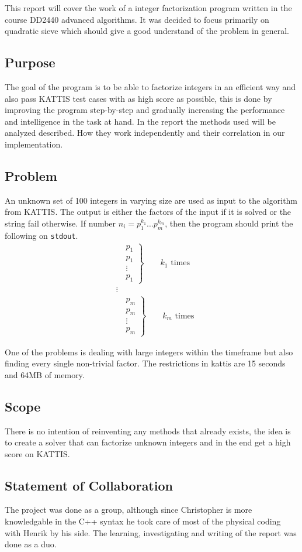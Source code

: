 This report will cover the work of a integer factorization program written in the course DD2440 advanced algorithms. It was decided to focus primarily on quadratic sieve which should give a good understand of the problem in general.

\subsection{Purpose}
The goal of the program is to be able to factorize integers in an efficient way and also pass KATTIS test cases with as high score as possible, this is done by improving the program step-by-step and gradually increasing the performance and intelligence in the task at hand. In the report the methods used will be analyzed described. How they work independently and their correlation in our implementation.

\subsection{Problem}
An unknown set of 100 integers in varying size are used as input to the algorithm from KATTIS. The output is either the factors of the input if it is solved or the string fail otherwise. If number $n_i = p_1^{k_1} \ldots p_m^{k_m}$, then the program should print the following on \texttt{stdout}.
\begin{align*}
&\left.\begin{aligned}
      &p_1 \\
      &p_1 \\
      &\vdots \\
      &p_1 
      \end{aligned}
\right\}
\qquad k_1 \text{ times} \\
&\vdots \\
&\left.\begin{aligned}
      &p_m \\
      &p_m \\
      &\vdots \\
      &p_m 
      \end{aligned}
\right\}
\qquad k_m \text{ times}
\end{align*}

One of the problems is dealing with large integers within the timeframe but also finding every single non-trivial factor. The restrictions in kattis are 15 seconds and 64MB of memory.
\subsection{Scope}
There is no intention of reinventing any methods that already exists, the idea is to create a solver that can factorize unknown integers and in the end get a high score on KATTIS.

\subsection{Statement of Collaboration}
The project was done as a group, although since Christopher is more knowledgable in the C++ syntax he took care of most of the physical coding with Henrik by his side. The learning, investigating and writing of the report was done as a duo.